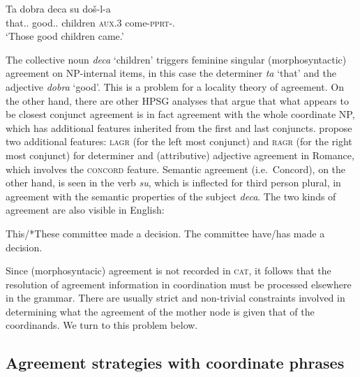 \documentclass[output=paper
                ,modfonts
                ,nonflat
	        ,collection
	        ,collectionchapter
	        ,collectiontoclongg
 	        ,biblatex
                ,babelshorthands
                ,newtxmath
                ,draftmode
                ,colorlinks, citecolor=brown
]{./langsci/langscibook}
\begin{document}
{\begin{exe}
\ex \gll Ta dobra deca su do\v{s}-l-a\\
         that.\sg.\fem{} good.\sg.\fem{} children \textsc{aux}.3\pl{} come-\textsc{pprt}-\neu.\pl\\
  \glt `Those good children came.'  \citep[51]{wechsler} 
\end{exe}

\noindent
The collective noun \emph{deca} `children' triggers feminine singular (morphosyntactic) agreement on NP-internal items, in this case the determiner \emph{ta} `that' and the adjective \emph{dobra} `good'.   This is a problem for a locality theory of agreement. On the other hand, there are other HPSG analyses that argue that what appears to be closest conjunct agreement is in fact agreement with the whole coordinate NP, which has additional features inherited from the first and last conjuncts. \citet[Section~5]{Villavicencio:Sadler:ea:05} propose two additional features: \textsc{lagr} (for the left most conjunct) and \textsc{ragr} (for the right most conjunct) for determiner and (attributive) adjective agreement in Romance, which involves the \textsc{concord} feature.
Semantic agreement (i.e.\ Concord), on the other hand, is seen in the verb \emph{su}, which  is inflected for third person plural, in agreement with the semantic properties of the subject \emph{deca}. The two kinds of agreement are also visible in
English:

\begin{exe}
\ex
\begin{xlista}
\ex This/*These committee made a decision.
\ex The committee have/has made a decision.
\end{xlista}
\end{exe}


\noindent
Since (morphosyntacic) agreement is not recorded in \textsc{cat}, it follows that the resolution of agreement information in coordination must be processed elsewhere in the grammar. There are usually strict and non-trivial constraints involved in determining what the agreement of the mother node is given that of the coordinands. We turn to this problem below.






\subsection{Agreement strategies with coordinate phrases}


}
\end{document}
